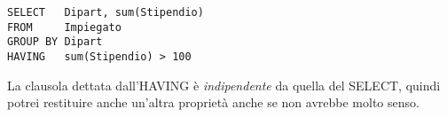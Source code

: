 \begin{lstlisting}
SELECT   Dipart, sum(Stipendio)
FROM     Impiegato
GROUP BY Dipart
HAVING   sum(Stipendio) > 100
\end{lstlisting}

La clausola dettata dall'HAVING è \emph{indipendente} da quella del SELECT, quindi potrei restituire anche un'altra proprietà anche se non avrebbe molto senso.
